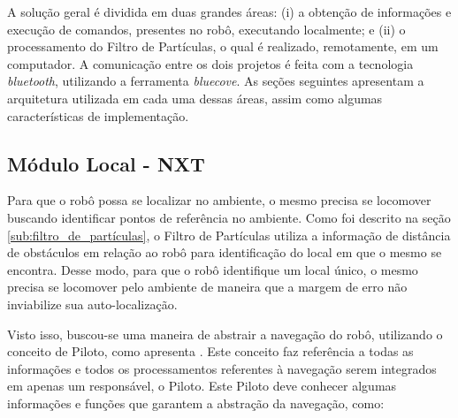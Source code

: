 	A solução geral é dividida em duas grandes áreas: (i) a obtenção de informações e execução de comandos, presentes no robô, executando
	localmente; e (ii) o processamento do Filtro de Partículas, o qual é realizado, remotamente, em um computador. A comunicação entre os dois projetos é feita com a
 	tecnologia \textit{bluetooth}, utilizando a ferramenta \textit{bluecove}. As seções seguintes apresentam a arquitetura
	utilizada em cada uma dessas áreas, assim como algumas características de implementação.

	\subsection{Módulo Local - NXT}


	Para que o robô possa se localizar no ambiente, o mesmo precisa se locomover buscando identificar pontos de referência no ambiente. Como foi descrito na
	seção \ref{sub:filtro_de_partículas}, o Filtro de Partículas utiliza a informação de distância de obstáculos em relação ao robô para identificação
	do local em que o mesmo se encontra. Desse modo, para que o robô identifique um local único, o mesmo precisa se locomover pelo ambiente de maneira
	que a margem de erro não inviabilize sua auto-localização.

	Visto isso, buscou-se uma maneira de abstrair a navegação do robô, utilizando o conceito de Piloto, como apresenta \cite{legonxj}. Este conceito
	faz referência a todas as informações e todos os processamentos referentes à navegação serem integrados em apenas um responsável, o Piloto. Este Piloto
	deve conhecer algumas informações e funções que garantem a abstração da navegação, como:

